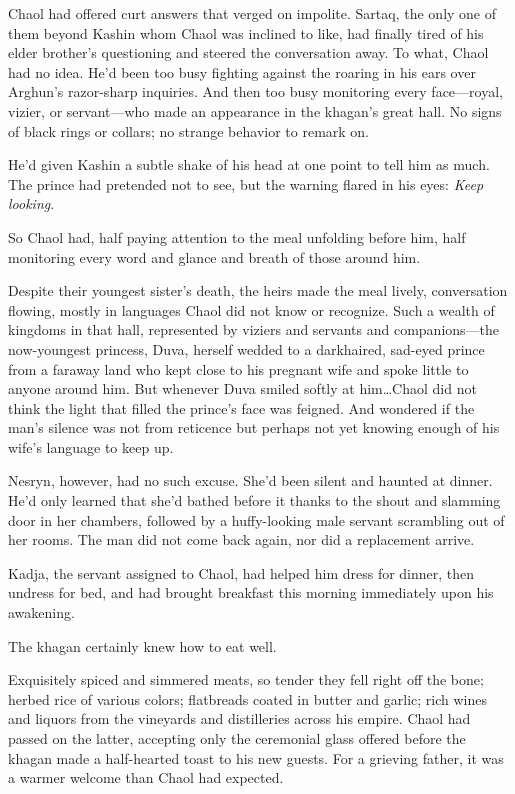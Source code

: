 Chaol had offered curt answers that verged on impolite.
Sartaq, the only one of them beyond Kashin whom Chaol was inclined to like, had finally tired of his elder brother's questioning and steered the conversation away.
To what, Chaol had no idea.
He'd been too busy fighting against the roaring in his ears over Arghun's razor-sharp inquiries.
And then too busy monitoring every face---royal, vizier, or servant---who made an appearance in the khagan's great hall.
No signs of black rings or collars; no strange behavior to remark on.

He'd given Kashin a subtle shake of his head at one point to tell him as much.
The prince had pretended not to see, but the warning flared in his eyes: \emph{Keep looking}.

So Chaol had, half paying attention to the meal unfolding before him, half monitoring every word and glance and breath of those around him.

Despite their youngest sister's death, the heirs made the meal lively, conversation flowing, mostly in languages Chaol did not know or recognize.
Such a wealth of kingdoms in that hall, represented by viziers and servants and companions---the now-youngest princess, Duva, herself wedded to a darkhaired, sad-eyed prince from a faraway land who kept close to his pregnant wife and spoke little to anyone around him.
But whenever Duva smiled softly at him\ldots Chaol did not think the light that filled the prince's face was feigned.
And wondered if the man's silence was not from reticence but perhaps not yet knowing enough of his wife's language to keep up.

Nesryn, however, had no such excuse.
She'd been silent and haunted at dinner.
He'd only learned that she'd bathed before it thanks to the shout and slamming door in her chambers, followed by a huffy-looking male servant scrambling out of her rooms.
The man did not come back again, nor did a replacement arrive.

Kadja, the servant assigned to Chaol, had helped him dress for dinner, then undress for bed, and had brought breakfast this morning immediately upon his awakening.

The khagan certainly knew how to eat well.

Exquisitely spiced and simmered meats, so tender they fell right off the bone; herbed rice of various colors; flatbreads coated in butter and garlic; rich wines and liquors from the vineyards and distilleries across his empire.
Chaol had passed on the latter, accepting only the ceremonial glass offered before the khagan made a half-hearted toast to his new guests.
For a grieving father, it was a warmer welcome than Chaol had expected.

